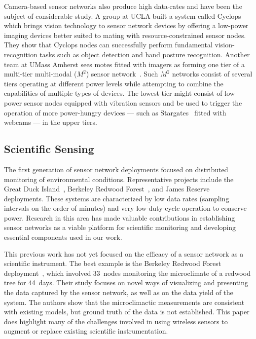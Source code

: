 Camera-based sensor networks also produce high data-rates and have been the
subject of considerable study. A group at UCLA built a system called
Cyclops~\cite{cyclops-sensys05} which brings vision technology to sensor
network devices by offering a low-power imaging devices better suited to mating
with resource-constrained sensor nodes. They show that Cyclops nodes can
successfully perform fundamental vision-recognition tasks such as object
detection and hand posture recognition. Another team at UMass Amherst sees
motes fitted with imagers as forming one tier of a multi-tier multi-modal
($M^2$) sensor network~\cite{m2-nossdav05}. Such $M^2$ networks consist of
several tiers operating at different power levels while attempting to combine
the capabilities of multiple types of devices. The lowest tier might consist of
low-power sensor nodes equipped with vibration sensors and be used to trigger
the operation of more power-hungry devices --- such as
Stargates~\cite{stargate} fitted with webcams --- in the upper tiers.

\subsection{Scientific Sensing}

The first generation of sensor network deployments focused on distributed
monitoring of environmental conditions. Representative projects include the
Great Duck Island~\cite{spm:04habitat,polastre-masters,mainwaring-habitat},
Berkeley Redwood Forest~\cite{berkeley-redwoods}, and James
Reserve~\cite{cerpa-habitat} deployments. These systems are characterized by
low data rates (sampling intervals on the order of minutes) and very
low-duty-cycle operation to conserve power. Research in this area has made
valuable contributions in establishing sensor networks as a viable platform
for scientific monitoring and developing essential components used in our
work. 

This previous work has not yet focused on the efficacy of a sensor network as
a scientific instrument. The best example is the Berkeley Redwood Forest
deployment~\cite{berkeley-redwoods}, which involved 33~nodes monitoring the
microclimate of a redwood tree for 44~days. Their study focuses on novel ways
of visualizing and presenting the data captured by the sensor network, as
well as on the data yield of the system. The authors show that the
microclimactic measurements are consistent with existing models, but ground
truth of the data is not established. This paper does highlight many of the
challenges involved in using wireless sensors to augment or replace existing
scientific instrumentation.

